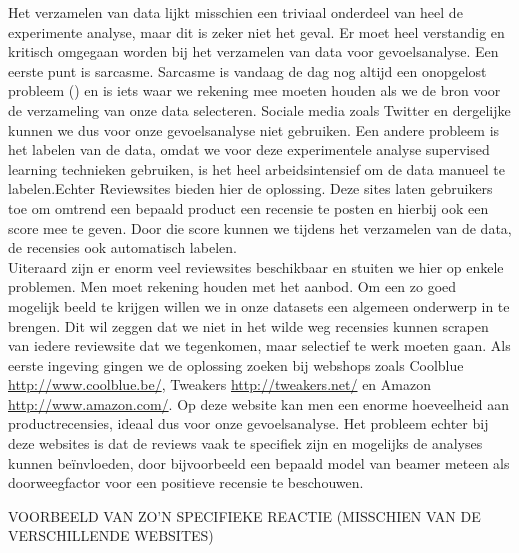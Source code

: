 Het verzamelen van data lijkt misschien een triviaal onderdeel van heel de experimente analyse, maar dit is zeker niet het geval. Er moet heel verstandig en kritisch omgegaan worden bij het verzamelen van data voor gevoelsanalyse. Een eerste punt is sarcasme. Sarcasme is vandaag de dag nog altijd een onopgelost probleem (\cite{liebrecht2013perfect}) en is iets waar we rekening mee moeten houden als we de bron voor de verzameling van onze data selecteren. Sociale media zoals Twitter en dergelijke kunnen we dus voor onze gevoelsanalyse niet gebruiken. Een andere probleem is het labelen van de data, omdat we voor deze experimentele analyse supervised learning technieken gebruiken, is het heel arbeidsintensief om de data manueel te labelen.Echter Reviewsites bieden hier de oplossing. Deze sites laten gebruikers toe om omtrend een bepaald product een recensie te posten en hierbij ook een score mee te geven. Door die score kunnen we tijdens het verzamelen van de data, de recensies ook automatisch labelen.\\

Uiteraard zijn er enorm veel reviewsites beschikbaar en stuiten we hier op enkele problemen. Men moet rekening houden met het aanbod. Om een zo goed mogelijk beeld te krijgen willen we in onze datasets een algemeen onderwerp in te brengen. Dit wil zeggen dat we niet in het wilde weg recensies kunnen scrapen van iedere reviewsite dat we tegenkomen, maar selectief te werk moeten gaan. Als eerste ingeving gingen we de oplossing zoeken bij webshops zoals Coolblue \url{http://www.coolblue.be/}, Tweakers \url{http://tweakers.net/} en Amazon \url{http://www.amazon.com/}. Op deze website kan men een enorme hoeveelheid aan productrecensies, ideaal dus voor onze gevoelsanalyse. Het probleem echter bij deze websites is dat de reviews vaak te specifiek zijn en mogelijks de analyses kunnen be\"invloeden, door bijvoorbeeld een bepaald model van beamer meteen als doorweegfactor voor een positieve recensie te beschouwen.


VOORBEELD VAN ZO'N SPECIFIEKE REACTIE (MISSCHIEN VAN DE VERSCHILLENDE WEBSITES)

